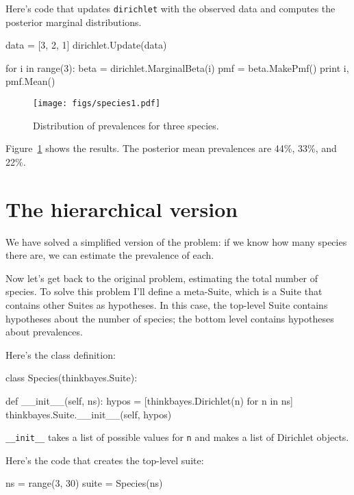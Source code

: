 \documentclass[12pt]{book}
\theoremstyle{exercise}
\newcommand{\py}[1]{{\tt #1}}%
\begin{document}
Here's code that updates \py{dirichlet} with the observed data and
computes the posterior marginal distributions.

\begin{code}
    data = [3, 2, 1]
    dirichlet.Update(data)

    for i in range(3):
        beta = dirichlet.MarginalBeta(i)
        pmf = beta.MakePmf()
        print i, pmf.Mean()
\end{code}

\begin{figure}
\centerline{\texttt{[image: figs/species1.pdf]}}
\caption{Distribution of prevalences for three species.}
\label{fig.species1}
\end{figure}

Figure~\ref{fig.species1} shows the results.  The posterior
mean prevalences are 44\%, 33\%, and 22\%.


\section{The hierarchical version}

We have solved a simplified version of the problem: if we
know how many species there are, we can estimate the prevalence
of each.

Now let's get back to the original problem, estimating the total
number of species.  To solve this problem I'll define a meta-Suite,
which is a Suite that contains other Suites as hypotheses.  In this
case, the top-level Suite contains hypotheses about the number of
species; the bottom level contains hypotheses about prevalences.

Here's the class definition:

\begin{code}
class Species(thinkbayes.Suite):

    def __init__(self, ns):
        hypos = [thinkbayes.Dirichlet(n) for n in ns]
        thinkbayes.Suite.__init__(self, hypos)
\end{code}

\verb"__init__" takes a list of possible values for \py{n} and
makes a list of Dirichlet objects.

Here's the code that creates the top-level suite:

\begin{code}
    ns = range(3, 30)
    suite = Species(ns)
\end{code}
\end{document}
